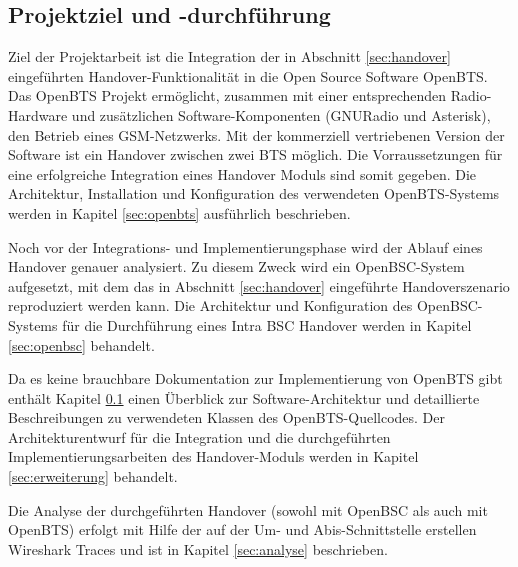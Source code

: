 \subsection{Projektziel und -durchführung}


Ziel der Projektarbeit ist die Integration der in Abschnitt \ref{sec:handover} eingeführten Handover-Funktionalität in die Open Source Software OpenBTS. Das OpenBTS Projekt ermöglicht, zusammen mit einer entsprechenden Radio-Hardware und zusätzlichen Software-Komponenten (GNURadio und Asterisk), den Betrieb eines GSM-Netzwerks. Mit der kommerziell vertriebenen Version der Software ist ein Handover zwischen zwei BTS möglich. Die Vorraussetzungen für eine erfolgreiche Integration eines Handover Moduls sind somit gegeben. Die Architektur, Installation und Konfiguration des verwendeten OpenBTS-Systems werden in Kapitel \ref{sec:openbts} ausführlich beschrieben.

Noch vor der Integrations- und Implementierungsphase wird der Ablauf eines Handover genauer analysiert. Zu diesem Zweck wird ein OpenBSC-System aufgesetzt, mit dem das in Abschnitt \ref{sec:handover} eingeführte Handoverszenario reproduziert werden kann. Die Architektur und Konfiguration des OpenBSC-Systems für die Durchführung eines Intra BSC Handover werden in Kapitel \ref{sec:openbsc} behandelt.

Da es keine brauchbare Dokumentation zur Implementierung von OpenBTS gibt enthält Kapitel \ref{} einen Überblick zur Software-Architektur und detaillierte Beschreibungen zu verwendeten Klassen des OpenBTS-Quellcodes. Der Architekturentwurf für die Integration und die durchgeführten Implementierungsarbeiten des Handover-Moduls werden in Kapitel \ref{sec:erweiterung} behandelt.

Die Analyse der durchgeführten Handover (sowohl mit OpenBSC als auch mit OpenBTS) erfolgt mit Hilfe der auf der Um- und Abis-Schnittstelle erstellen Wireshark Traces und ist in Kapitel \ref{sec:analyse} beschrieben.
